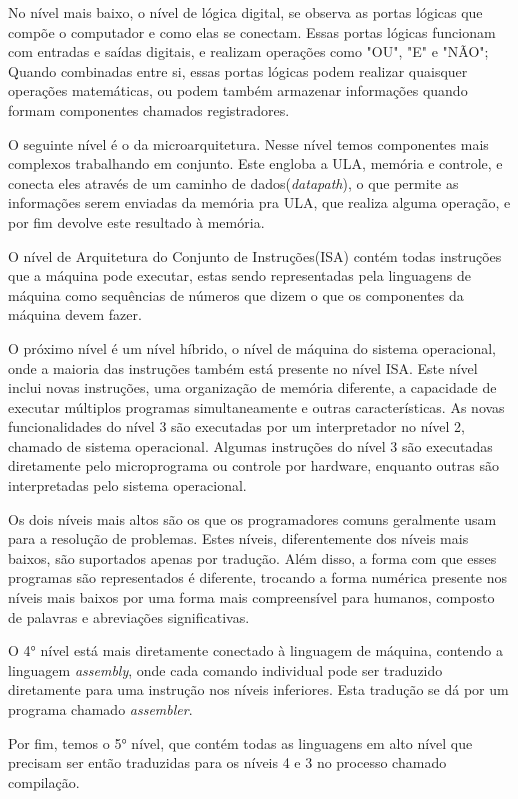 \documentclass[
	12pt,				%
	openright,			%
	oneside,			%
	a4paper,			%
	english,			%
	french,				%
	spanish,			%
	brazil,				%
	]{abntex2}
\begin{document}
No nível mais baixo, o nível de lógica digital, se observa as portas lógicas que compõe o computador e como elas se conectam. Essas portas lógicas funcionam com entradas e saídas digitais, e realizam operações como "OU", "E" e "NÃO"; Quando combinadas entre si, essas portas lógicas podem realizar quaisquer operações matemáticas, ou podem também armazenar informações quando formam componentes chamados registradores.

O seguinte nível é o da microarquitetura.  Nesse nível temos componentes mais complexos trabalhando em conjunto. Este engloba a ULA, memória e controle, e conecta eles através de um caminho de dados(\textit{datapath}), o que permite as informações serem enviadas da memória pra ULA, que realiza alguma operação, e por fim devolve este resultado à memória.

O nível de Arquitetura do Conjunto de Instruções(ISA) contém todas instruções que a máquina pode executar, estas sendo representadas pela linguagens de máquina como sequências de números que dizem o que os componentes da máquina devem fazer. 

O próximo nível é um nível híbrido, o nível de máquina do sistema operacional, onde a maioria das instruções também está presente no nível ISA. Este nível inclui novas instruções, uma organização de memória diferente, a capacidade de executar múltiplos programas simultaneamente e outras características.  As novas funcionalidades do nível 3 são executadas por um interpretador no nível 2, chamado de sistema operacional. Algumas instruções do nível 3 são executadas diretamente pelo microprograma ou controle por hardware, enquanto outras são interpretadas pelo sistema operacional.

Os dois níveis mais altos são os que os programadores comuns geralmente usam para a resolução de problemas. Estes níveis, diferentemente dos níveis mais baixos, são suportados apenas por tradução.  Além disso, a forma com que esses programas são representados é diferente, trocando a forma numérica presente nos níveis mais baixos por uma forma mais compreensível para humanos, composto de palavras e abreviações significativas.

O 4° nível está mais diretamente conectado à linguagem de máquina, contendo a linguagem \textit{assembly}, onde cada comando individual pode ser traduzido diretamente para uma instrução nos níveis inferiores. Esta tradução se dá por um programa chamado \textit{assembler}.

Por fim, temos o 5° nível, que contém todas as linguagens em alto nível que precisam ser então traduzidas para os níveis 4 e 3 no processo chamado compilação.\cite[p.5-8]{tanenbaum_structured_2013}
\end{document}
